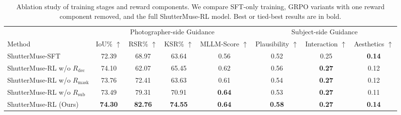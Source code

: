 \documentclass{article} %
\begin{document}
\begin{table}[!t]
\centering
\caption{
Ablation study of training stages and reward components. We compare SFT-only training,
GRPO variants with one reward component removed, and the full ShutterMuse-RL model.
Best or tied-best results are in bold.
}
\label{tab:ablation}
\small
\setlength{\tabcolsep}{5pt}
\renewcommand{\arraystretch}{1.05}
\begin{adjustbox}{max width=\textwidth}
\begin{tabular}{lccccccc}
\toprule
& \multicolumn{4}{c}{Photographer-side Guidance} 
& \multicolumn{3}{c}{Subject-side Guidance} \\
\cmidrule(lr){2-5} \cmidrule(lr){6-8}
Method
& IoU\% $\uparrow$ 
& RSR\% $\uparrow$ 
& KSR\% $\uparrow$ 
& MLLM-Score $\uparrow$ 
& Plausibility $\uparrow$ 
& Interaction $\uparrow$ 
& Aesthetics $\uparrow$ \\
\midrule
ShutterMuse-SFT
& 72.39 & 68.97 & 63.64 & 0.56 & 0.52 & 0.25 & \textbf{0.14} \\
\midrule
ShutterMuse-RL w/o $R_{\mathrm{dec}}$
& 74.10 & 62.07 & 65.45 & 0.62 & 0.56 & \textbf{0.27} & 0.12 \\
ShutterMuse-RL w/o $R_{\mathrm{mask}}$
& 73.76 & 72.41 & 63.63 & 0.61 & 0.54 & \textbf{0.27} & 0.12 \\
ShutterMuse-RL w/o $R_{\mathrm{sub}}$
& 73.49 & 79.31 & 70.91 & \textbf{0.64} & 0.53 & \textbf{0.27} & 0.11 \\
\rowcolor{myblue}
ShutterMuse-RL (Ours)
& \textbf{74.30} & \textbf{82.76} & \textbf{74.55} & \textbf{0.64} 
& \textbf{0.58} & \textbf{0.27} & \textbf{0.14} \\
\bottomrule
\end{tabular}
\end{adjustbox}
\end{table}
\end{document}
